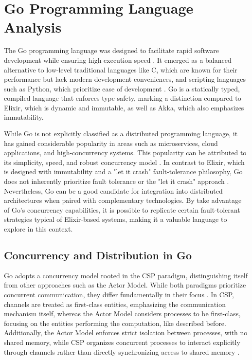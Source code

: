 \section{Go Programming Language Analysis}

The Go programming language was designed to facilitate rapid software development while ensuring high execution speed \cite{Kennedy2016, Cox-Buday2017}. It emerged as a balanced alternative to low-level traditional languages like C, which are known for their performance but lack modern development conveniences, and scripting languages such as Python, which prioritize ease of development \cite{Kennedy2016}. Go is a statically typed, compiled language that enforces type safety, marking a distinction compared to Elixir, which is dynamic and immutable, as well as Akka, which also emphasizes immutability.

While Go is not explicitly classified as a distributed programming language, it has gained considerable popularity in areas such as microservices, cloud applications, and high-concurrency systems. This popularity can be attributed to its simplicity, speed, and robust concurrency model \cite{Castro2019,Shuiskov2022}. In contrast to Elixir, which is designed with immutability and a "let it crash" fault-tolerance philosophy, Go does not inherently prioritize fault tolerance or the "let it crash" approach \cite{Cox-Buday2017}. Nevertheless, Go can be a good candidate for integration into distributed architectures when paired with complementary technologies. By take advantage of Go’s concurrency capabilities, it is possible to replicate certain fault-tolerant strategies typical of Elixir-based systems, making it a valuable language to explore in this context.

\subsection{Concurrency and Distribution in Go}

Go adopts a concurrency model rooted in the \gls{CSP} paradigm, distinguishing itself from other approaches such as the Actor Model. While both paradigms prioritize concurrent communication, they differ fundamentally in their focus \cite{Cox-Buday2017}. In \gls{CSP}, channels are treated as first-class entities, emphasizing the communication mechanism itself, whereas the Actor Model considers processes to be first-class, focusing on the entities performing the computation, like described before. Additionally, the Actor Model enforces strict isolation between processes, with no shared memory, while \gls{CSP} organizes concurrent processes to interact explicitly through channels rather than directly synchronizing access to shared memory \cite{Cox-Buday2017}.  

